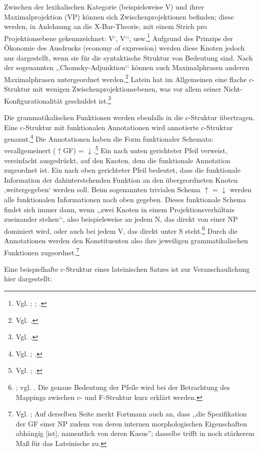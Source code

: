 \documentclass[12pt,a4paper]{article}
\begin{document}
Zwischen der lexikalischen Kategorie (beispielsweise V) und ihrer Maximalprojektion (VP) können sich Zwischenprojektionen befinden; diese werden, in Anlehnung an die X-Bar-Theorie, mit einem Strich pro Projektionsebene gekennzeichnet: V‘, V‘‘, usw.\footnote{Vgl. \cite[15-6]{Rohrer}; \cite[56-7]{Dal}; \cite[5]{Skript}.} Aufgrund des Prinzips der Ökonomie des Ausdrucks (economy of expression) werden diese Knoten jedoch nur dargestellt, wenn sie für die syntaktische Struktur von Bedeutung sind. Nach der sogenannten ,,Chomsky-Adjunktion‘‘ können auch Maximalphrasen anderen Maximalphrasen untergeordnet werden.\footnote{Vgl. \cite[46; 57]{Dal}.} Latein hat im Allgemeinen eine flache c-Struktur mit wenigen Zwischenprojektionsebenen, was vor allem seiner Nicht-Konfigurationalität geschuldet ist.\footnote{Vgl. \cite[46]{Rohrer}.}

Die grammatikalischen Funktionen werden ebenfalls in die c-Struktur übertragen. Eine c-Struktur mit funktionalen Annotationen wird annotierte c-Struktur genannt.\footnote{Vgl. \cite[69]{Falk}; \cite[22]{Rohrer}.} Die Annotationen haben die Form funktionaler Schemata: verallgemeinert ($\uparrow$GF) = $\downarrow$.\footnote{Vgl. \cite[33]{Rohrer}; \cite[15-6]{Skript}.} Ein nach unten gerichteter Pfeil verweist, vereinfacht ausgedrückt, auf den Knoten, dem die funktionale Annotation zugeordnet ist. Ein nach oben gerichteter Pfeil bedeutet, dass die funktionale Information der dahinterstehenden Funktion an den übergeordneten Knoten ,weitergegeben‘ werden soll. Beim sogenannten trivialen Schema $\uparrow$ = $\downarrow$ werden alle funktionalen Informationen nach oben gegeben. Dieses funktionale Schema findet sich immer dann, wenn ,,zwei Knoten in einem Projektionsverhältnis zueinander stehen‘‘, also beispielsweise an jedem N, das direkt von einer NP dominiert wird, oder auch bei jedem V, das direkt unter S steht.\footnote{\cite[28]{Skript}; vgl. \cite[25; 33]{Rohrer}. Die genaue Bedeutung der Pfeile wird bei der Betrachtung des Mappings zwischen c- und F-Struktur kurz erklärt werden.} Durch die Annotationen werden den Konstituenten also ihre jeweiligen grammatikalischen Funktionen zugeordnet.\footnote{Vgl. \cite[28]{Skript}; Auf derselben Seite merkt Fortmann auch an, dass ,,die Spezifikation der GF einer NP zudem von deren internen morphologischen Eigenschaften abhängig [ist], namentlich von deren Kasus''; dasselbe trifft in noch stärkerem Maß für das Lateinische zu.}

Eine beispielhafte c-Struktur eines lateinischen Satzes ist zur Veranschaulichung hier dargestellt:
\end{document}
